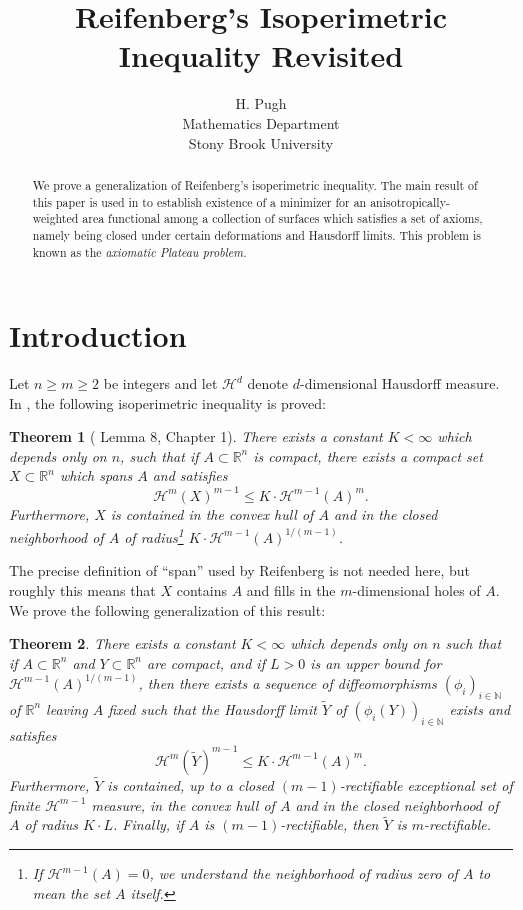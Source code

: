 \documentclass[10pt]{amsart}
\newtheorem{thm}{Theorem}
\theoremstyle{definition}
\theoremstyle{definition}
\theoremstyle{definition}
\theoremstyle{definition}
\theoremstyle{definition}
\theoremstyle{definition}
\theoremstyle{definition}
\newcommand{\R}{\ensuremath{\mathbb{R}}}
\newcommand{\N}{\ensuremath{\mathbb{N}}}
\newcommand{\<}{\langle}
\renewcommand{\>}{\rangle}
\def\i{\infty}
\def\H{\mathcal{H}}
\begin{document}
 
	
\author[H. Pugh]{H. Pugh\\ Mathematics Department \\ Stony Brook University} 
\title{Reifenberg's Isoperimetric Inequality Revisited}
\begin{abstract}
	We prove a generalization of Reifenberg's isoperimetric inequality. The main result of this paper is used in \cite{elliptic} to establish existence of a minimizer for an anisotropically-weighted area functional among a collection of surfaces which satisfies a set of axioms, namely being closed under certain deformations and Hausdorff limits. This problem is known as the \emph{axiomatic Plateau problem.}
\end{abstract}

\maketitle

\section{Introduction}
Let \( n\geq m\geq 2 \) be integers and let \( \H^d \) denote \( d \)-dimensional Hausdorff measure. In \cite{reifenberg}, the following isoperimetric inequality is proved:

\begin{thm}[\cite{reifenberg} Lemma 8, Chapter 1]
	\label{thm:lem8}
	There exists a constant \( K<\i \) which depends only on \( n \), such that if \( A\subset \R^n \) is compact, there exists a compact set \( X\subset \R^n \) which spans \( A \) and satisfies \[ \H^m(X)^{m-1} \leq K\cdot \H^{m-1}(A)^m. \] Furthermore, \( X \) is contained in the convex hull of \( A \) and in the closed neighborhood of \( A \) of radius\footnote{If \( \H^{m-1}(A)=0 \), we understand the neighborhood of radius zero of \( A \) to mean the set \( A \) itself.} \( K\cdot \H^{m-1}(A)^{1/(m-1)} \).
\end{thm}

The precise definition of ``span'' used by Reifenberg is not needed here, but roughly this means that \( X \) contains \( A \) and fills in the \( m \)-dimensional holes of \( A \). We prove the following generalization of this result:

\begin{thm}
	\label{thm:main0}
	There exists a constant \( K<\i \) which depends only on \( n \) such that if \( A\subset \R^n \) and \( Y\subset \R^n \) are compact, and if \( L>0 \) is an upper bound for \( \H^{m-1}(A)^{1/(m-1)} \), then there exists a sequence of diffeomorphisms \( (\phi_i)_{i\in \N} \) of \( \R^n \) leaving \( A \) fixed such that the Hausdorff limit \( \tilde{Y} \) of \( (\phi_i(Y))_{i\in \N} \) exists and satisfies \[ \H^m(\tilde{Y})^{m-1} \leq K\cdot \H^{m-1}(A)^m. \] Furthermore, \( \tilde{Y} \) is contained, up to a closed \( (m-1) \)-rectifiable exceptional set of finite \( \H^{m-1} \) measure, in the convex hull of \( A \) and in the closed neighborhood of \( A \) of radius \( K\cdot L \). Finally, if \( A \) is \( (m-1) \)-rectifiable, then \( \tilde{Y} \) is \( m \)-rectifiable.
\end{thm}
\end{document}
